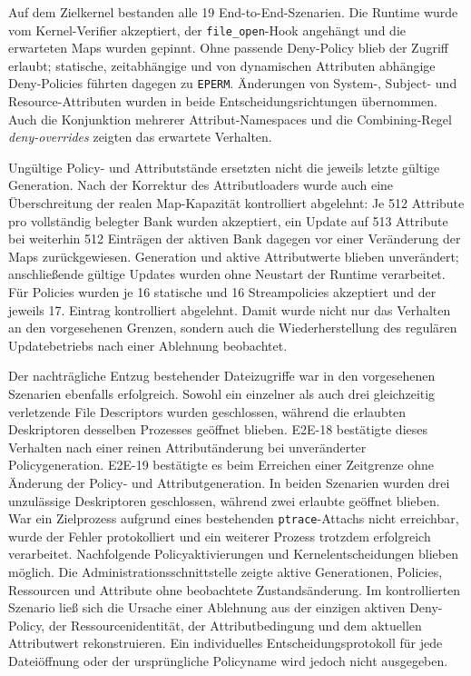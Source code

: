 Auf dem Zielkernel bestanden alle 19 End-to-End-Szenarien. Die Runtime wurde vom
Kernel-Verifier akzeptiert, der \texttt{file\_open}-Hook angehängt und die erwarteten Maps wurden
gepinnt. Ohne passende Deny-Policy blieb der Zugriff erlaubt; statische, zeitabhängige und von
dynamischen Attributen abhängige Deny-Policies führten dagegen zu \texttt{EPERM}. Änderungen von
System-, Subject- und Resource-Attributen wurden in beide Entscheidungsrichtungen übernommen.
Auch die Konjunktion mehrerer Attribut-Namespaces und die Combining-Regel
\emph{deny-overrides} zeigten das erwartete Verhalten.

Ungültige Policy- und Attributstände ersetzten nicht die jeweils letzte gültige Generation.
Nach der Korrektur des Attributloaders wurde auch eine Überschreitung der realen Map-Kapazität
kontrolliert abgelehnt: Je 512 Attribute pro vollständig belegter Bank wurden akzeptiert, ein
Update auf 513 Attribute bei weiterhin 512 Einträgen der aktiven Bank dagegen vor einer
Veränderung der Maps zurückgewiesen. Generation und aktive Attributwerte blieben unverändert;
anschließende gültige Updates wurden ohne Neustart der Runtime verarbeitet. Für Policies wurden
je 16 statische und 16 Streampolicies akzeptiert und der jeweils 17. Eintrag kontrolliert
abgelehnt. Damit wurde nicht nur das Verhalten an den vorgesehenen Grenzen, sondern auch die
Wiederherstellung des regulären Updatebetriebs nach einer Ablehnung beobachtet.

Der nachträgliche Entzug bestehender Dateizugriffe war in den vorgesehenen Szenarien ebenfalls
erfolgreich. Sowohl ein einzelner als auch drei gleichzeitig verletzende File Descriptors wurden
geschlossen, während die erlaubten Deskriptoren desselben Prozesses geöffnet blieben.
E2E-18 bestätigte dieses Verhalten nach einer reinen Attributänderung bei unveränderter
Policygeneration. E2E-19 bestätigte es beim Erreichen einer Zeitgrenze ohne Änderung der
Policy- und Attributgeneration. In beiden Szenarien wurden drei unzulässige Deskriptoren
geschlossen, während zwei erlaubte geöffnet blieben. War ein
Zielprozess aufgrund eines bestehenden \texttt{ptrace}-Attachs nicht erreichbar, wurde der
Fehler protokolliert und ein weiterer Prozess trotzdem erfolgreich verarbeitet. Nachfolgende
Policyaktivierungen und Kernelentscheidungen blieben möglich. Die Administrationsschnittstelle
zeigte aktive Generationen, Policies, Ressourcen und Attribute ohne beobachtete Zustandsänderung.
Im kontrollierten Szenario ließ sich die Ursache einer Ablehnung aus der einzigen aktiven
Deny-Policy, der Ressourcenidentität, der Attributbedingung und dem aktuellen Attributwert
rekonstruieren. Ein individuelles Entscheidungsprotokoll für jede Dateiöffnung oder der
ursprüngliche Policyname wird jedoch nicht ausgegeben.

